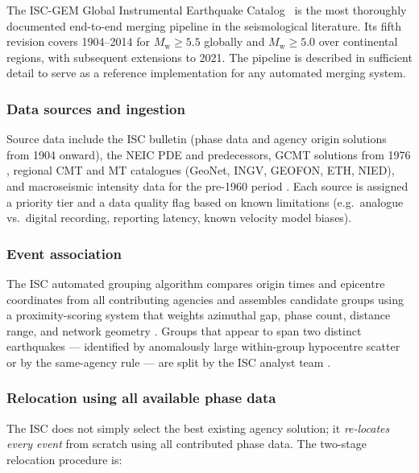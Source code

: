 \documentclass[12pt]{article}
\newcommand{\Catalog}{Catalog}
\begin{document}
The ISC-GEM Global Instrumental Earthquake \Catalog\
\citep{Storchak2013, ISCGEM2018} is the most thoroughly documented end-to-end
merging pipeline in the seismological literature.  Its fifth revision
\citep{ISCGEM2018} covers 1904--2014 for $M_\mathrm{w} \geq 5.5$ globally and
$M_\mathrm{w} \geq 5.0$ over continental regions, with subsequent extensions to
2021.  The pipeline is described in sufficient detail to serve as a reference
implementation for any automated merging system.

\subsubsection{Data sources and ingestion}

Source data include the ISC bulletin (phase data and agency origin solutions
from 1904 onward), the NEIC PDE and predecessors, GCMT solutions from 1976
\citep{Dziewonski1981, Ekstrom2012}, regional CMT and MT catalogues (GeoNet,
INGV, GEOFON, ETH, NIED), and macroseismic intensity data for the pre-1960
period \citep{Storchak2013}.  Each source is assigned a priority tier and a
data quality flag based on known limitations (e.g.\ analogue vs.\ digital
recording, reporting latency, known velocity model biases).

\subsubsection{Event association}

The ISC automated grouping algorithm compares origin times and epicentre
coordinates from all contributing agencies and assembles candidate groups using
a proximity-scoring system that weights azimuthal gap, phase count, distance
range, and network geometry \citep{Bondar2011}.  Groups that appear to span two
distinct earthquakes — identified by anomalously large within-group
hypocentre scatter or by the same-agency rule — are split by the ISC analyst
team \citep{ISCBulletinRebuild2020}.

\subsubsection{Relocation using all available phase data}

The ISC does not simply select the best existing agency solution; it
\emph{re-locates every event} from scratch using all contributed phase data.
The two-stage relocation procedure is:
\end{document}

